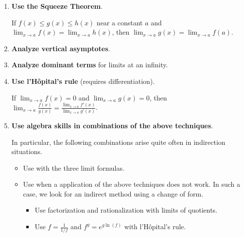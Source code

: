 \documentclass[../main.tex]{subfiles}
\begin{document}
\begin{enumerate}
  \item \textbf{Use the Squeeze Theorem}.

    If \(f(x) \le g(x) \le h(x)\) near a constant \(a\) and \(\lim_{x \to a} f(x) = \lim_{x \to a} h(x)\), then \(\lim_{x \to a} g(x) = \lim_{x \to a} f(a)\).

  \item \textbf{Analyze vertical asymptotes}.

  \item \textbf{Analyze dominant terms} for limits at an infinity.

  \item \textbf{Use l'H\^opital's rule} (requires differentiation).

    If \(\lim_{x \to a} f(x) = 0\) and \(\lim_{x \to a} g(x) = 0\), then \(\lim_{x \to a} \frac{f(x)}{g(x)} = \frac{\displaystyle \lim_{x \to a} f'(x)}{\displaystyle \lim_{x \to a} g'(x)}\).

  \item \textbf{Use algebra skills in combinations of the above techniques}.

    In particular, the following combinations arise quite often in indirection situations.
    \begin{itemize}
      \item Use  with the three limit formulas.
      \item Use  when a  application of the above techniques does not work. In such a case, we look for an indirect method using a change of form.
        \begin{itemize}
          \item Use factorization and rationalization with limits of quotients.
          \item Use \(f = \frac{1}{1/f}\) and \(f^{g} = e^{g \ln(f)}\) with l'H\^opital's rule.
        \end{itemize}
    \end{itemize}
\end{enumerate}
\end{document}
